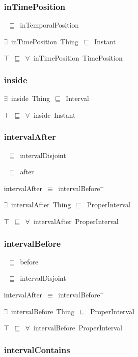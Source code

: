 \documentclass{article}
\begin{document}
\subsubsection*{inTimePosition}

~\ensuremath{\sqsubseteq}~inTemporalPosition

\ensuremath{\exists}~inTimePosition~Thing~\ensuremath{\sqsubseteq}~Instant

\ensuremath{\top}~\ensuremath{\sqsubseteq}~\ensuremath{\forall}~inTimePosition~TimePosition

\subsubsection*{inside}

\ensuremath{\exists}~inside~Thing~\ensuremath{\sqsubseteq}~Interval

\ensuremath{\top}~\ensuremath{\sqsubseteq}~\ensuremath{\forall}~inside~Instant

\subsubsection*{intervalAfter}

~\ensuremath{\sqsubseteq}~intervalDisjoint

~\ensuremath{\sqsubseteq}~after

intervalAfter~\ensuremath{\equiv}~intervalBefore\ensuremath{^-}

\ensuremath{\exists}~intervalAfter~Thing~\ensuremath{\sqsubseteq}~ProperInterval

\ensuremath{\top}~\ensuremath{\sqsubseteq}~\ensuremath{\forall}~intervalAfter~ProperInterval

\subsubsection*{intervalBefore}

~\ensuremath{\sqsubseteq}~before

~\ensuremath{\sqsubseteq}~intervalDisjoint

intervalAfter~\ensuremath{\equiv}~intervalBefore\ensuremath{^-}

\ensuremath{\exists}~intervalBefore~Thing~\ensuremath{\sqsubseteq}~ProperInterval

\ensuremath{\top}~\ensuremath{\sqsubseteq}~\ensuremath{\forall}~intervalBefore~ProperInterval

\subsubsection*{intervalContains}
\end{document}
